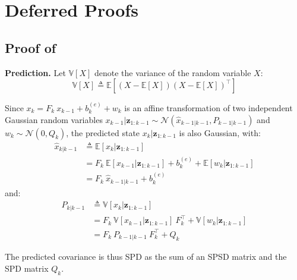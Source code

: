 \chapter{Deferred Proofs}

\vfill
\localtableofcontents
\vfill
\newpage

\section[Proof of Proposition 2.3]{Proof of }\label{sec:proof_Kalman}

\textbf{Prediction.} Let $\mathbb{V}[X]$ denote the variance of the random variable $X$:
\begin{equation}
	\mathbb{V}[X]\triangleq\mathbb{E}\left[(X-\mathbb{E}[X])(X-\mathbb{E}[X])^\top\right]
\end{equation}

Since $x_k=F_k\:x_{k-1}+b_k^{(e)}+w_k$ is an affine transformation of two independent Gaussian random variables $x_{k-1}|\mathbf{z}_{1:k-1}\sim\mathcal{N}\left(\hat{x}_{k-1|k-1},P_{k-1|k-1}\right)$ and $w_k\sim\mathcal{N}(0,Q_k)$, the predicted state $x_k|\mathbf{z}_{1:k-1}$ is also Gaussian, with:
\begin{equation}
	\begin{aligned}
	\hat{x}_{k|k-1}&\triangleq\mathbb{E}[x_k|\mathbf{z}_{1:k-1}]\\
	&=F_k\:\mathbb{E}[x_{k-1}|\mathbf{z}_{1:k-1}]+b_k^{(e)}+\mathbb{E}[w_k|\mathbf{z}_{1:k-1}]\\
	&=F_k\:\hat{x}_{k-1|k-1}+b_k^{(e)}
	\end{aligned}
\end{equation}
and:
\begin{equation}
	\begin{aligned}
	P_{k|k-1}&\triangleq\mathbb{V}[x_k|\mathbf{z}_{1:k-1}]\\
	&=F_k\:\mathbb{V}[x_{k-1}|\mathbf{z}_{1:k-1}]\:F_k^\top+\mathbb{V}[w_k|\mathbf{z}_{1:k-1}]\\
	&=F_k\:P_{k-1|k-1}\:F_k^\top+Q_k
	\end{aligned}
\end{equation}

The predicted covariance is thus SPD as the sum of an SPSD matrix and the SPD matrix $Q_k$.

